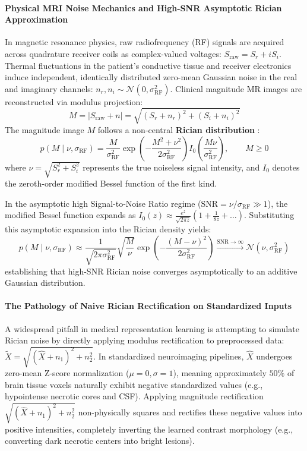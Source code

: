 \documentclass{article}
\begin{document}
\paragraph{Physical MRI Noise Mechanics and High-SNR Asymptotic Rician Approximation}
In magnetic resonance physics, raw radiofrequency (RF) signals are acquired across quadrature receiver coils as complex-valued voltages: $S_{\text{raw}} = S_r + i S_i$. Thermal fluctuations in the patient's conductive tissue and receiver electronics induce independent, identically distributed zero-mean Gaussian noise in the real and imaginary channels: $n_r, n_i \sim \mathcal{N}(0, \sigma_{\text{RF}}^2)$. Clinical magnitude MR images are reconstructed via modulus projection:
\begin{equation}
    M = |S_{\text{raw}} + n| = \sqrt{(S_r + n_r)^2 + (S_i + n_i)^2}
\end{equation}
The magnitude image $M$ follows a non-central \textbf{Rician distribution} \citep{gudbjartsson1995rician}:
\begin{equation}
    p(M \mid \nu, \sigma_{\text{RF}}) = \frac{M}{\sigma_{\text{RF}}^2} \exp\left( - \frac{M^2 + \nu^2}{2\sigma_{\text{RF}}^2} \right) I_0\left( \frac{M \nu}{\sigma_{\text{RF}}^2} \right), \qquad M \ge 0
\end{equation}
where $\nu = \sqrt{S_r^2 + S_i^2}$ represents the true noiseless signal intensity, and $I_0$ denotes the zeroth-order modified Bessel function of the first kind.

In the asymptotic high Signal-to-Noise Ratio regime ($\text{SNR} = \nu / \sigma_{\text{RF}} \gg 1$), the modified Bessel function expands as $I_0(z) \approx \frac{e^z}{\sqrt{2\pi z}} \left( 1 + \frac{1}{8z} + \dots \right)$. Substituting this asymptotic expansion into the Rician density yields:
\begin{equation}
    p(M \mid \nu, \sigma_{\text{RF}}) \approx \frac{1}{\sqrt{2\pi \sigma_{\text{RF}}^2}} \sqrt{\frac{M}{\nu}} \exp\left( - \frac{(M - \nu)^2}{2\sigma_{\text{RF}}^2} \right) \xrightarrow{\text{SNR} \to \infty} \mathcal{N}(\nu, \sigma_{\text{RF}}^2)
\end{equation}
establishing that high-SNR Rician noise converges asymptotically to an additive Gaussian distribution.

\paragraph{The Pathology of Naive Rician Rectification on Standardized Inputs}
A widespread pitfall in medical representation learning is attempting to simulate Rician noise by directly applying modulus rectification to preprocessed data: $\tilde{X} = \sqrt{(\hat{X} + n_1)^2 + n_2^2}$. In standardized neuroimaging pipelines, $\hat{X}$ undergoes zero-mean Z-score normalization ($\mu = 0, \sigma = 1$), meaning approximately $50\%$ of brain tissue voxels naturally exhibit negative standardized values (e.g., hypointense necrotic cores and CSF). Applying magnitude rectification $\sqrt{(\hat{X} + n_1)^2 + n_2^2}$ non-physically squares and rectifies these negative values into positive intensities, completely inverting the learned contrast morphology (e.g., converting dark necrotic centers into bright lesions).
\end{document}
